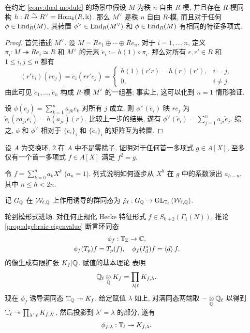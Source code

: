 \begin{lemma}
	在约定 \ref{conv:dual-module} 的场景中假设 $M$ 为秩 $n$ 自由 $R$-模, 并且存在 $R$-模同构 $h: R \stackrel{\sim}{\rightarrow} R^\vee = \operatorname{Hom}_\Bbbk(R, \Bbbk)$. 那么 $M^\vee$ 是秩 $n$ 自由 $R$-模, 而且对于任何 $\phi \in \operatorname{End}_R(M)$, 其转置 $\phi^\vee \in \operatorname{End}_R(M^\vee)$ 和 $\phi \in \operatorname{End}_R(M)$ 有相同的特征多项式.
\end{lemma}
\begin{proof}
	首先描述 $M^\vee$. 设 $M = Re_1 \oplus \cdots \oplus Re_n$. 对于 $i = 1, \ldots, n$, 定义 $\pi_i: M \twoheadrightarrow Re_i \simeq R$ 和 $M^\vee$ 的元素 $\check{e}_i := h(1) \circ \pi_i$. 那么对所有 $r, r' \in R$ 和 $1 \leq i, j \leq n$ 都有
	\[ (r' \check{e}_i) (r e_j) = \check{e}_i(r r' e_j) = \begin{cases}
		h(1)(r' r) = h(r)(r'), & i = j, \\
		0, & i \neq j.
	\end{cases}\]
	由此可见 $\check{e}_1, \ldots, \check{e}_n$ 构成 $R$-模 $M^\vee$ 的一组基; 事实上, 这可以化到 $n = 1$ 情形验证.

	设 $\phi(e_j) = \sum_{k=1}^n a_{jk} e_k$ 对所有 $j$ 成立, 则 $\phi^\vee(\check{e}_i)$ 映 $re_j$ 为 $\check{e}_i(ra_{ji} e_i) = h(a_{ji})(r)$. 比较上一步的结果, 遂有 $\phi^\vee(\check{e}_i) = \sum_{j=1}^n a_{ji} \check{e}_j$. 综之, $\phi$ 和 $\phi^\vee$ 相对于 $\{e_i\}_i$ 和 $\{\check{e}_i\}_i$ 的矩阵互为转置.
\end{proof}

\begin{exercise}\label{exo:monic-squareroot}
	设 $A$ 为交换环, $2$ 在 $A$ 中不是零除子. 证明对于任何首一多项式 $g \in A[X]$, 至多仅有一个首一多项式 $f \in A[X]$ 满足 $f^2 = g$.

	\begin{hint}
		令 $f = \sum_{k=0}^n a_k X^k$ ($a_n = 1$). 列式说明如何逐步从 $X^h$ 在 $g$ 中的系数读出 $a_{h-n}$, 其中 $n \leq h < 2n$.
	\end{hint}
\end{exercise}

记 $G_{\mathbb{Q}}$ 在 $\mathcal{W}_{\ell, \mathbb{Q}}$ 上作用诱导的群同态为 $\check{\rho}_\ell: G_{\mathbb{Q}} \to \operatorname{GL}_{\mathbb{T}_\ell}\left(\mathcal{W}_{\ell, \mathbb{Q}}\right)$.

轮到模形式进场. 对任何正规化 Hecke 特征形式 $f \in S_{k+2}(\Gamma_1(N))$, 推论 \ref{prop:algebraic-eigenvalue} 断言环同态
\begin{gather*}
	\phi_f: \mathbb{T}_{\mathbb{Z}} \to \mathbb{C}, \\
	\phi_f(T_p) f = T_p(f), \quad \phi_f(I_d^*) f = \left\langle d \right\rangle f.
\end{gather*}
的像生成有限扩张 $K_f | \mathbb{Q}$. 赋值的基本理论 \cite[定理 10.7.7]{Li1} 表明
\[ \mathbb{Q}_\ell \underset{\mathbb{Q}}{\otimes} K_f = \prod_{\lambda \mid \ell} K_{f,\lambda}. \]
现在 $\phi_f$ 诱导满同态 $\mathbb{T}_{\mathbb{Q}} \twoheadrightarrow K_f$. 给定赋值 $\lambda$ 如上, 对满同态两端取 $- \underset{\mathbb{Q}}{\otimes} \mathbb{Q}_\ell$ 以得到 $\mathbb{T}_\ell \twoheadrightarrow \prod_{\lambda' \mid \ell} K_{f, \lambda'}$, 然后投影到 $\lambda' = \lambda$ 的部分, 遂有
\begin{equation}
	\phi_{f, \lambda}: \mathbb{T}_\ell \twoheadrightarrow K_{f, \lambda}.
\end{equation}


